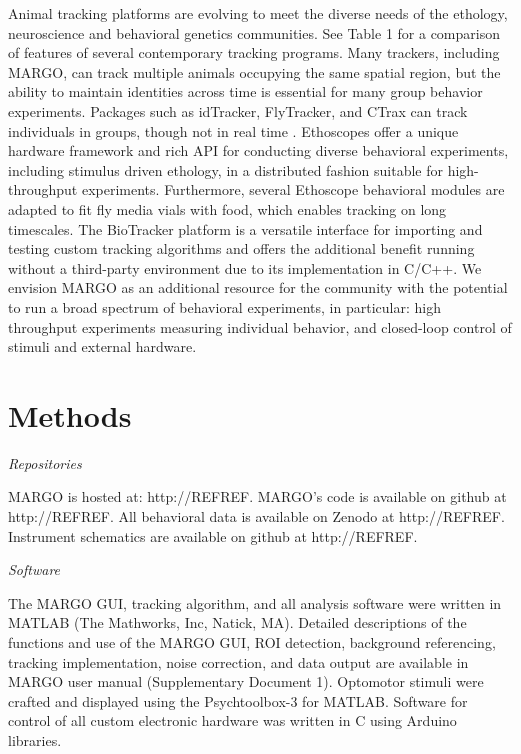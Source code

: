 \documentclass[10pt]{article}
\begin{document}
\begin{multicols}{2}
Animal tracking platforms are evolving to meet the diverse needs of the ethology, neuroscience and behavioral genetics communities. See Table 1 for a comparison of features of several contemporary tracking programs. Many trackers, including MARGO, can track multiple animals occupying the same spatial region, but the ability to maintain identities across time is essential for many group behavior experiments. Packages such as idTracker, FlyTracker, and CTrax can track individuals in groups, though not in real time \cite{Prez-Escudero_idTracker_2014,Eyjolfsdottir_Detecting_2014,Branson_High_2009}. Ethoscopes offer a unique hardware framework and rich API for conducting diverse behavioral experiments, including stimulus driven ethology, in a distributed fashion suitable for high-throughput experiments\cite{Geissmann_Ethoscopes_2017}. Furthermore, several Ethoscope behavioral modules are adapted to fit fly media vials with food, which enables tracking on long timescales. The BioTracker platform is a versatile interface for importing and testing custom tracking algorithms and offers the additional benefit running without a third-party environment due to its implementation in C/C++\cite{Mnck_BioTracker_2018}. We envision MARGO as an additional resource for the community with the potential to run a broad spectrum of behavioral experiments, in particular: high throughput experiments measuring individual behavior, and closed-loop control of stimuli and external hardware.

\section*{Methods}

\noindent\textit{Repositories}
\vspace*{0.3cm}

MARGO is hosted at: http://REFREF. MARGO's code is available on github at http://REFREF. All behavioral data is available on Zenodo at http://REFREF. Instrument schematics are available on github at http://REFREF.


\vspace*{0.5cm}
\noindent\textit{Software}
\vspace*{0.3cm}

The MARGO GUI, tracking algorithm, and all analysis software were written in MATLAB (The Mathworks, Inc, Natick, MA). Detailed descriptions of the functions and use of the MARGO GUI, ROI detection, background referencing, tracking implementation, noise correction, and data output are available in MARGO user manual (Supplementary Document 1). Optomotor stimuli were crafted and displayed using the Psychtoolbox-3 for MATLAB. Software for control of all custom electronic hardware was written in C using Arduino libraries.


\end{multicols}
\end{document}
